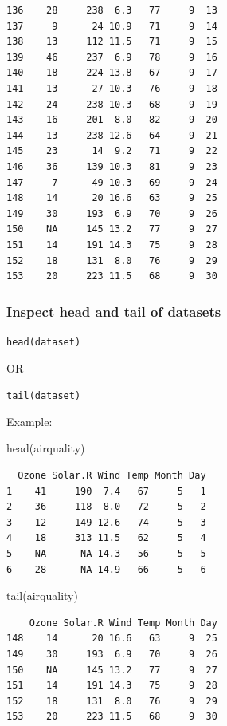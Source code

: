 \documentclass[
  letterpaper,
  DIV=11,
  numbers=noendperiod]{scrreprt}
\newenvironment{Shaded}{\begin{snugshade}}{\end{snugshade}}
\newcommand{\FunctionTok}[1]{\textcolor[rgb]{0.28,0.35,0.67}{#1}}
\newcommand{\NormalTok}[1]{\textcolor[rgb]{0.00,0.23,0.31}{#1}}
\begin{document}
\begin{verbatim}
136    28     238  6.3   77     9  13
137     9      24 10.9   71     9  14
138    13     112 11.5   71     9  15
139    46     237  6.9   78     9  16
140    18     224 13.8   67     9  17
141    13      27 10.3   76     9  18
142    24     238 10.3   68     9  19
143    16     201  8.0   82     9  20
144    13     238 12.6   64     9  21
145    23      14  9.2   71     9  22
146    36     139 10.3   81     9  23
147     7      49 10.3   69     9  24
148    14      20 16.6   63     9  25
149    30     193  6.9   70     9  26
150    NA     145 13.2   77     9  27
151    14     191 14.3   75     9  28
152    18     131  8.0   76     9  29
153    20     223 11.5   68     9  30
\end{verbatim}

\subsubsection{Inspect head and tail of
datasets}\label{inspect-head-and-tail-of-datasets}

\texttt{head(dataset)}

OR

\texttt{tail(dataset)}

Example:

\begin{Shaded}
\begin{Highlighting}[]
\FunctionTok{head}\NormalTok{(airquality)}
\end{Highlighting}
\end{Shaded}

\begin{verbatim}
  Ozone Solar.R Wind Temp Month Day
1    41     190  7.4   67     5   1
2    36     118  8.0   72     5   2
3    12     149 12.6   74     5   3
4    18     313 11.5   62     5   4
5    NA      NA 14.3   56     5   5
6    28      NA 14.9   66     5   6
\end{verbatim}

\begin{Shaded}
\begin{Highlighting}[]
\FunctionTok{tail}\NormalTok{(airquality)}
\end{Highlighting}
\end{Shaded}

\begin{verbatim}
    Ozone Solar.R Wind Temp Month Day
148    14      20 16.6   63     9  25
149    30     193  6.9   70     9  26
150    NA     145 13.2   77     9  27
151    14     191 14.3   75     9  28
152    18     131  8.0   76     9  29
153    20     223 11.5   68     9  30
\end{verbatim}
\end{document}

